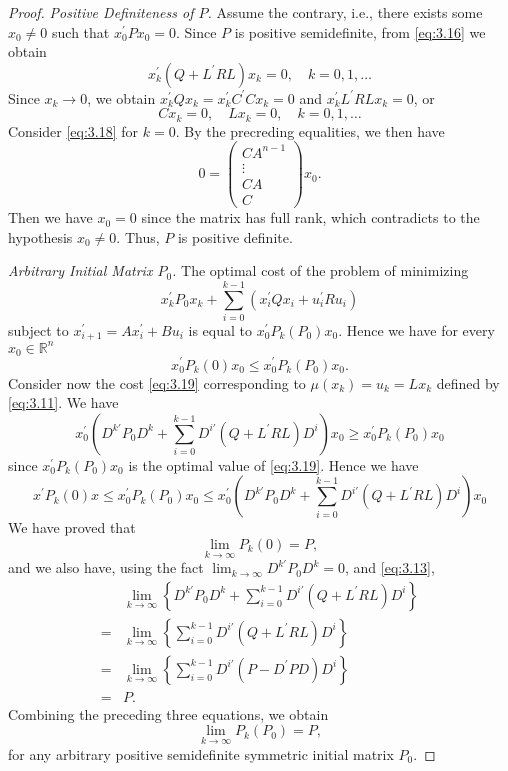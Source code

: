 \begin{proof}
\textit{Positive Definiteness of $P$.} 
Assume the contrary, i.e., there exists some $x_0\neq 0$ such that $x_0^{\prime} P x_0=0$. Since $P$ is positive semidefinite, from \cref{eq:3.16} we obtain \[x_k^\prime (Q + L^\prime R L)x_k = 0,\quad k = 0,1,\dots\]
Since $x_k\rightarrow 0$, we obtain $x_k^\prime Q x_k=x_k^\prime C^\prime C x_k=0$ and $x_k^\prime L^\prime R L x_k=0$, or
\[Cx_k = 0,\quad L x_k = 0,\quad k = 0,1,\dots\]
Consider \cref{eq:3.18} for $k=0$. By the precreding equalities, we then have 
\[0 = \begin{pmatrix}
    CA^{n - 1}\\ 
    \vdots\\ CA \\ C 
\end{pmatrix}x_0.\]
Then we have $x_0=0$ since the matrix has full rank, which contradicts to the hypothesis $x_0\neq 0$. Thus, $P$ is positive definite.

\textit{Arbitrary Initial Matrix $P_0$.} 
The optimal cost of the problem of minimizing
\begin{equation}
    x_k^\prime P_0 x_k + \sum_{i=0}^{k-1} (x_i^{\prime} Q x_i + u_i^{\prime} R u_i)\label{eq:3.19}
\end{equation}
subject to $x_{i+1}^{\prime} =A x_i^{\prime} +B u_i$ is equal to $x_0^{\prime} P_k(P_0)x_0$. Hence we have for every $x_0\in\mathbb{R}^n$
\[x_0^\prime P_k(0)x_0 \leq x_0^\prime P_k(P_0)x_0.\]
Consider now the cost \cref{eq:3.19} corresponding to $\mu(x_k)=u_k=L x_k$ defined by \cref{eq:3.11}. We have 
\[x_0^\prime \left(D^{k\prime}P_0 D^k + \sum_{i=0}^{k-1} D^{i\prime}(Q + L^\prime R L)D^i\right)x_0 \geq x_0^\prime P_k(P_0)x_0\]
since $x_0^\prime P_k(P_0)x_0$ is the optimal value of \cref{eq:3.19}.
Hence we have 
\[x^\prime P_k(0)x 
\leq x_0^\prime P_k(P_0)x_0 
\leq x_0^\prime \left(D^{k\prime}P_0 D^k + \sum_{i=0}^{k-1} D^{i\prime}(Q +
L^\prime R L)D^i\right)x_0 \]
We have proved that 
\[\lim_{k\rightarrow\infty} P_k(0) = P,\]
and we also have, using the fact $\lim_{k\rightarrow\infty} D^{k\prime}P_0 D^k=0$, and \cref{eq:3.13},
\begin{equation}
    \begin{aligned}
        &\lim_{k\rightarrow\infty} \left\{ D^{k\prime}P_0
        D^k + \sum_{i=0}^{k-1} D^{i\prime}(Q + L^\prime R L)D^i\right\}\\
        =&\lim_{k\rightarrow\infty} \left\{\sum_{i=0}^{k-1} D^{i\prime}(Q + L^\prime RL)D^i\right\}\\
        =&\lim_{k\rightarrow\infty} \left\{\sum_{i=0}^{k-1} D^{i\prime}(P - D^\prime PD)D^i\right\}\\
        =&P.
    \end{aligned}
\end{equation}
Combining the preceding three equations, we obtain
\[\lim_{k\rightarrow\infty} P_k(P_0) = P,\]
for any arbitrary positive semidefinite symmetric initial matrix $P_0$.


\end{proof}
